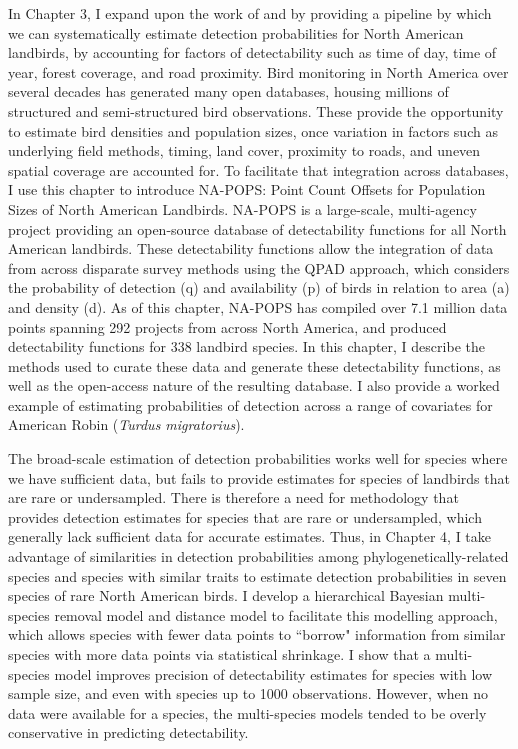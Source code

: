\par In Chapter 3, I expand upon the work of \citet{solymos_calibrating_2013} and \citet{solymos_evaluating_2018} by providing a pipeline by which we can systematically estimate detection probabilities for North American landbirds, by accounting for factors of detectability such as time of day, time of year, forest coverage, and road proximity.
Bird monitoring in North America over several decades has generated many open databases, housing millions of structured and semi-structured bird observations. 
These provide the opportunity to estimate bird densities and population sizes, once variation in factors such as underlying field methods, timing, land cover, proximity to roads, and uneven spatial coverage are accounted for. 
To facilitate that integration across databases, I use this chapter to introduce NA-POPS: Point Count Offsets for Population Sizes of North American Landbirds. 
NA-POPS is a large-scale, multi-agency project providing an open-source database of detectability functions for all North American landbirds. 
These detectability functions allow the integration of data from across disparate survey methods using the QPAD approach, which considers the probability of detection (q) and availability (p) of birds in relation to area (a) and density (d). 
As of this chapter, NA-POPS has compiled over 7.1 million data points spanning 292 projects from across North America, and produced detectability functions for 338 landbird species. 
In this chapter, I describe the methods used to curate these data and generate these detectability functions, as well as the open-access nature of the resulting database. 
I also provide a worked example of estimating probabilities of detection across a range of covariates for American Robin (\textit{Turdus migratorius}).


\par The broad-scale estimation of detection probabilities works well for species where we have sufficient data, but fails to provide estimates for species of landbirds that are rare or undersampled.
There is therefore a need for methodology that provides detection estimates for species that are rare or undersampled, which generally lack sufficient data for accurate estimates. 
Thus, in Chapter 4, I take advantage of similarities in detection probabilities among phylogenetically-related species and species with similar traits to estimate detection probabilities in seven species of rare North American birds.
I develop a hierarchical Bayesian multi-species removal model and distance model to facilitate this modelling approach, which allows species with fewer data points to ``borrow" information from similar species with more data points via statistical shrinkage. 
I show that a multi-species model improves precision of detectability estimates for species with low sample size, and even with species up to 1000 observations.
However, when no data were available for a species, the multi-species models tended to be overly conservative in predicting detectability. 

